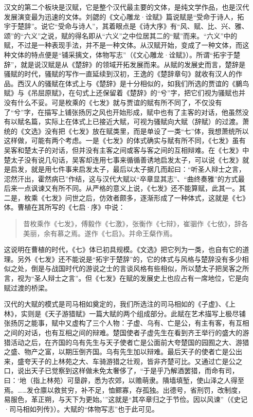汉文的第二个板块是汉赋，它是整个汉代最主要的文体，是纯文学作品，也是汉代发展演变最为迅速的文体。刘勰的《文心雕龙·诠赋》篇说赋是“受命于诗人，拓宇于楚辞”。说它“受命与诗人”，其着眼点是《诗大序》有“风、赋、比、兴、雅、颂”的“六义”之说，赋的得名即从“六义”之中位居其二的“赋”而来。“六义”中的赋，不过是一种表现手法，并不是一种文体。从汉赋开始，变成了一种文体，而这种文体的特点便是“铺采摛文，体物写志”（《文心雕龙·诠赋》）。所谓“拓宇于楚辞”，就是说汉赋是从《楚辞》的领域开拓发展而来。从赋的发展史而言，楚辞是骚赋的时代，骚赋的写作一直延续到汉初，王逸的《楚辞章句》就收有汉人的作品。西汉人的骚赋在体式上与《楚辞》是十分相似的，如我们所选的贾谊的《鵩鸟赋》与《吊屈原赋》，在句式上还保留着《楚辞》的“兮”字，把它们视为骚赋也并没有什么不妥。可是枚乘的《七发》就与贾谊的赋有所不同了，不仅没有了“兮”字，在描写上铺张扬厉之风也开始形成，赋中也有了主客的对话，他虽然没有以赋名篇，实际上在体式上已接近大赋，可视为骚赋向大赋（辞赋）的过渡。萧统的《文选》没有把《七发》放在赋类里，而是单设了一类“七”体，我想萧统所以这样做，可能有两个考虑。一是《七发》的体式确实与赋有所不同，《七发》虽有吴客和楚太子的对话，但并没有主客之间或客与客之间的互相辩难。在《七发》中楚太子没有说几句话，吴客却连用七事来循循善诱地启发太子，可以说《七发》就是启发，就是用七件事来启发太子，最后以太子据几而起曰：“听圣人辩士之言，涊然汗出，霍然病已”作结，这与汉代大赋以“卒章显其志”、“曲终奏雅”的方式最后来一点讽谏又有所不同。从严格的意义上说，《七发》还不能算赋，此其一。其二是，枚乘《七发》问世之后，仿效者颇多，逐渐形成了一种体式，这就是《七》体。曹植在其所写的《七启·序》中说：

\begin{quote}
昔枚乘作《七发》，傅毅作《七激》，张衡作《七辩》，崔骃作《七依》，辞各美丽，余有慕之焉。遂作《七启》。并命王粲作焉。
\end{quote}

这说明在曹植的时代，《七》体已初具规模。《文选》把它列为一类，也自有它的道理。另外《七发》还不能说是“拓宇于楚辞”的，它的体式与风格与楚辞没有多少相似之处，倒是与战国时代的游说之士的言谈风格有些相似，所以楚太子把吴客之所言，视为“圣人辩士之言”。但《七发》在赋的发展史上也应占有一席地位，它是向赋过渡的桥梁。

汉代的大赋的模式是司马相如奠定的，我们所选注的司马相如的《子虚》、《上林》，实则是《天子游猎赋》一篇大赋的两个组成部分。此赋在艺术描写上极尽铺张扬厉之能事，赋中又虚构了三个人物：子虚、乌有、亡是公，有主有客，有互相之间的对话，也有互相之间的辩难。楚国使者子虚先生在看到齐王举行的盛大的游猎活动之后，在齐国的乌有先生与天子使者亡是公面前大夸楚国的园囿之大、游猎之盛、物产之富，以期压倒齐国。乌有先生加以辩难。最后天子的使者亡是公出来，盛夸天子的上林苑之大、车骑游猎之壮观，皆非齐楚可比。又通过亡是公之口，说出天子已觉察到这样做未免太奢侈了，“于是乎乃解酒罢猎，而命有司，曰：‘地（指上林苑）可垦辟，悉为农郊，以赡萌隶。隤墙填堑，使山泽之人得至焉。……发仓廪以救贫穷，补不足，恤鳏寡，存孤独。出德号，省刑罚，改制度，易服色，革正朔，与天下为更始。’”这就是“其卒章归之于节俭。因以风谏”（《史记·司马相如列传》）。大赋的“体物写志”也于此可见。

